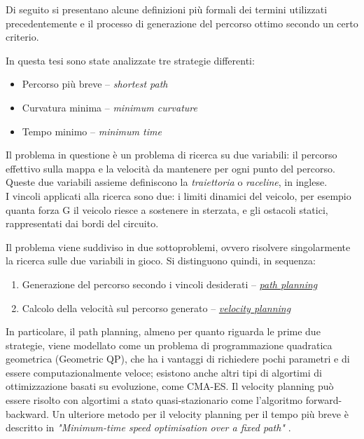 Di seguito si presentano alcune definizioni più formali dei termini utilizzati precedentemente e il
processo di generazione del percorso ottimo secondo un certo criterio.

\bigskip
\noindent In questa tesi sono state analizzate tre strategie differenti:
\begin{itemize}
	\setlength\itemsep{0em}
	\item Percorso più breve  -- \textit{shortest path}
	\item Curvatura minima -- \textit{minimum curvature}
	\item Tempo minimo -- \textit{minimum time}
\end{itemize}

\noindent Il problema in questione è un problema di ricerca su due variabili: il percorso effettivo sulla mappa e
la velocità da mantenere per ogni punto del percorso. Queste due variabili assieme definiscono la
\textit{traiettoria} o \textit{raceline}, in inglese.\\
I vincoli applicati alla ricerca sono due: i limiti dinamici del veicolo, per esempio quanta forza G il
veicolo riesce a sostenere in sterzata, e gli ostacoli statici, rappresentati dai bordi del circuito.

\bigskip
\noindent Il problema viene suddiviso in due sottoproblemi, ovvero risolvere singolarmente la ricerca sulle due
variabili in gioco. Si distinguono quindi, in sequenza:
\begin{enumerate}
	\setlength\itemsep{0em}
	\item Generazione del percorso secondo i vincoli desiderati -- \hyperref[sec:path-models]{\textit{path
		planning}}
	\item Calcolo della velocità sul percorso generato -- \hyperref[sec:velocity-plan]{\textit{velocity
		planning}}
\end{enumerate}
In particolare, il path planning, almeno per quanto riguarda le prime due strategie, viene modellato come
un problema di programmazione quadratica geometrica (Geometric QP), che ha i vantaggi di richiedere pochi
parametri e di essere computazionalmente veloce; esistono anche altri tipi di algortimi di ottimizzazione
basati su evoluzione, come CMA-ES. Il velocity planning può essere risolto con algortimi a stato
quasi-stazionario come l'algoritmo forward-backward. Un ulteriore metodo per il velocity planning per il
tempo più breve è descritto in \textit{"Minimum-time speed optimisation over a fixed path"}
\cite{lipp2014minimum}.

